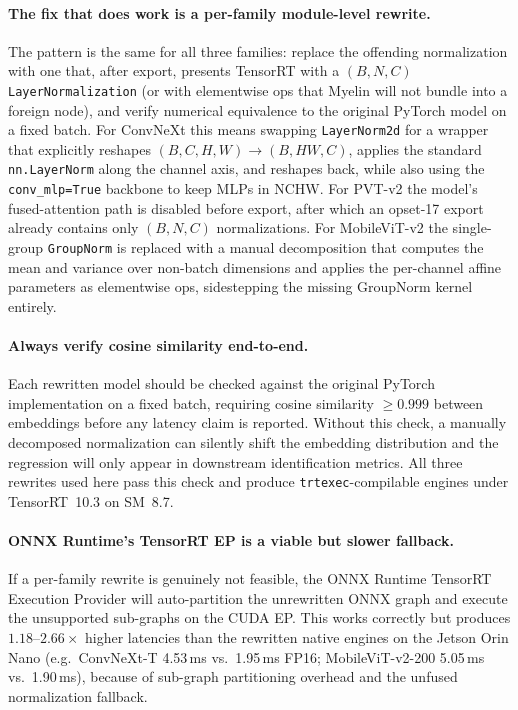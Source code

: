 \documentclass[runningheads,a4paper]{llncs}
\begin{document}
\paragraph{The fix that does work is a per-family module-level rewrite.} The pattern is the same for all three families: replace the offending normalization with one that, after export, presents TensorRT with a $(B,N,C)$ \texttt{LayerNormalization} (or with elementwise ops that Myelin will not bundle into a foreign node), and verify numerical equivalence to the original PyTorch model on a fixed batch. For ConvNeXt this means swapping \texttt{LayerNorm2d} for a wrapper that explicitly reshapes $(B,C,H,W)\!\rightarrow\!(B,HW,C)$, applies the standard \texttt{nn.LayerNorm} along the channel axis, and reshapes back, while also using the \texttt{conv\_mlp=True} backbone to keep MLPs in NCHW. For PVT-v2 the model's fused-attention path is disabled before export, after which an opset-17 export already contains only $(B,N,C)$ normalizations. For MobileViT-v2 the single-group \texttt{GroupNorm} is replaced with a manual decomposition that computes the mean and variance over non-batch dimensions and applies the per-channel affine parameters as elementwise ops, sidestepping the missing GroupNorm kernel entirely.

\paragraph{Always verify cosine similarity end-to-end.} Each rewritten model should be checked against the original PyTorch implementation on a fixed batch, requiring cosine similarity $\geq 0.999$ between embeddings before any latency claim is reported. Without this check, a manually decomposed normalization can silently shift the embedding distribution and the regression will only appear in downstream identification metrics. All three rewrites used here pass this check and produce \texttt{trtexec}-compilable engines under TensorRT~10.3 on SM~8.7.

\paragraph{ONNX Runtime's TensorRT EP is a viable but slower fallback.} If a per-family rewrite is genuinely not feasible, the ONNX Runtime TensorRT Execution Provider will auto-partition the unrewritten ONNX graph and execute the unsupported sub-graphs on the CUDA EP. This works correctly but produces $1.18$--$2.66\times$ higher latencies than the rewritten native engines on the Jetson Orin Nano (e.g.\ ConvNeXt-T 4.53\,ms vs.\ 1.95\,ms FP16; MobileViT-v2-200 5.05\,ms vs.\ 1.90\,ms), because of sub-graph partitioning overhead and the unfused normalization fallback.
\end{document}
